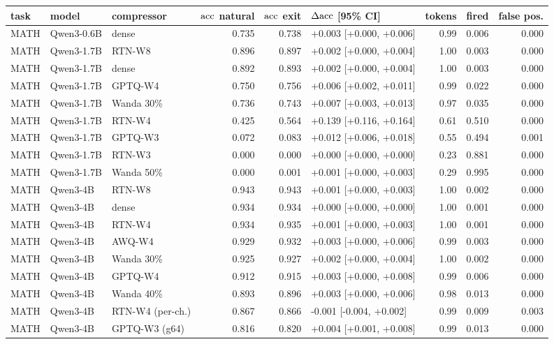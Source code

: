 \begin{tabular}{lllrrlrrr}
\toprule
task & model & compressor & $\mathrm{acc}$ natural & $\mathrm{acc}$ exit & $\Delta\mathrm{acc}$ [95\% CI] & tokens & fired & false pos. \\
\midrule
MATH & Qwen3-0.6B & dense & 0.735 & 0.738 & +0.003 [+0.000, +0.006] & 0.99 & 0.006 & 0.000 \\
MATH & Qwen3-1.7B & RTN-W8 & 0.896 & 0.897 & +0.002 [+0.000, +0.004] & 1.00 & 0.003 & 0.000 \\
MATH & Qwen3-1.7B & dense & 0.892 & 0.893 & +0.002 [+0.000, +0.004] & 1.00 & 0.003 & 0.000 \\
MATH & Qwen3-1.7B & GPTQ-W4 & 0.750 & 0.756 & +0.006 [+0.002, +0.011] & 0.99 & 0.022 & 0.000 \\
MATH & Qwen3-1.7B & Wanda 30\% & 0.736 & 0.743 & +0.007 [+0.003, +0.013] & 0.97 & 0.035 & 0.000 \\
MATH & Qwen3-1.7B & RTN-W4 & 0.425 & 0.564 & +0.139 [+0.116, +0.164] & 0.61 & 0.510 & 0.000 \\
MATH & Qwen3-1.7B & GPTQ-W3 & 0.072 & 0.083 & +0.012 [+0.006, +0.018] & 0.55 & 0.494 & 0.001 \\
MATH & Qwen3-1.7B & RTN-W3 & 0.000 & 0.000 & +0.000 [+0.000, +0.000] & 0.23 & 0.881 & 0.000 \\
MATH & Qwen3-1.7B & Wanda 50\% & 0.000 & 0.001 & +0.001 [+0.000, +0.003] & 0.29 & 0.995 & 0.000 \\
MATH & Qwen3-4B & RTN-W8 & 0.943 & 0.943 & +0.001 [+0.000, +0.003] & 1.00 & 0.002 & 0.000 \\
MATH & Qwen3-4B & dense & 0.934 & 0.934 & +0.000 [+0.000, +0.000] & 1.00 & 0.001 & 0.000 \\
MATH & Qwen3-4B & RTN-W4 & 0.934 & 0.935 & +0.001 [+0.000, +0.003] & 1.00 & 0.001 & 0.000 \\
MATH & Qwen3-4B & AWQ-W4 & 0.929 & 0.932 & +0.003 [+0.000, +0.006] & 0.99 & 0.003 & 0.000 \\
MATH & Qwen3-4B & Wanda 30\% & 0.925 & 0.927 & +0.002 [+0.000, +0.004] & 1.00 & 0.002 & 0.000 \\
MATH & Qwen3-4B & GPTQ-W4 & 0.912 & 0.915 & +0.003 [+0.000, +0.008] & 0.99 & 0.006 & 0.000 \\
MATH & Qwen3-4B & Wanda 40\% & 0.893 & 0.896 & +0.003 [+0.000, +0.006] & 0.98 & 0.013 & 0.000 \\
MATH & Qwen3-4B & RTN-W4 (per-ch.) & 0.867 & 0.866 & -0.001 [-0.004, +0.002] & 0.99 & 0.009 & 0.003 \\
MATH & Qwen3-4B & GPTQ-W3 (g64) & 0.816 & 0.820 & +0.004 [+0.001, +0.008] & 0.99 & 0.013 & 0.000 \\

\end{tabular}
